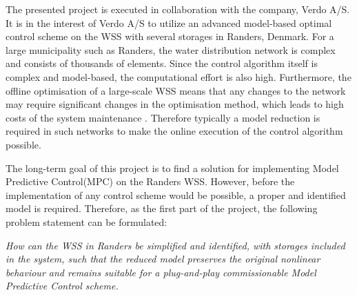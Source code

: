 The presented project is executed in collaboration with the company, Verdo A/S. It is in the interest of Verdo A/S to utilize an advanced model-based optimal control scheme on the WSS with several storages in Randers, Denmark. For a large municipality such as Randers, the water distribution network is complex and consists of thousands of elements. Since the control algorithm itself is complex and model-based, the computational effort is also high. Furthermore, the offline optimisation of a large-scale WSS means that any changes to the network may require significant changes in the optimisation method, which leads to high costs of the system maintenance \cite{brdys1994operational}. Therefore typically a model reduction is required in such networks to make the online execution of the control algorithm possible. 

The long-term goal of this project is to find a solution for implementing Model Predictive Control(MPC) on the Randers WSS. However, before the implementation of any control scheme would be possible, a proper and identified model is required. Therefore, as the first part of the project, the following problem statement can be formulated: 

\emph{How can the WSS in Randers be simplified and identified, with storages included in the system, such that the reduced model preserves the original nonlinear behaviour and remains suitable for a plug-and-play commissionable Model Predictive Control scheme.}









